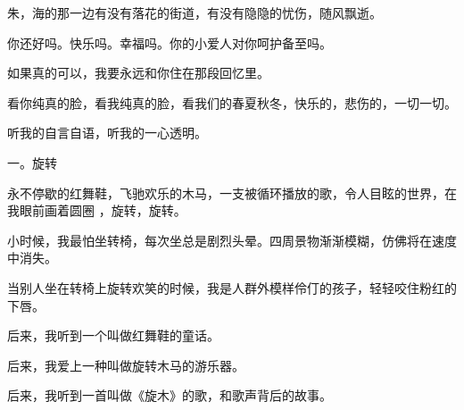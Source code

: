 \documentclass[12pt,a4paper]{article}
\def\blankrev{\vspace{1ex}}									%
\newcommand{\subpart}[1]{
	\begingroup \par
	\vspace{1ex} \centering #1
	\par \endgroup \nopagebreak[4]
}
\begin{document}
		朱，海的那一边有没有落花的街道，有没有隐隐的忧伤，随风飘逝。

		你还好吗。快乐吗。幸福吗。你的小爱人对你呵护备至吗。

		如果真的可以，我要永远和你住在那段回忆里。

		看你纯真的脸，看我纯真的脸，看我们的春夏秋冬，快乐的，悲伤的，一切一切。

	\endwriting




		听我的自言自语，听我的一心透明。


		\subpart{一。旋转}

		永不停歇的红舞鞋，飞驰欢乐的木马，一支被循环播放的歌，令人目眩的世界，在我眼前画着圆圈
	，旋转，旋转。

		小时候，我最怕坐转椅，每次坐总是剧烈头晕。四周景物渐渐模糊，仿佛将在速度中消失。\par
		当别人坐在转椅上旋转欢笑的时候，我是人群外模样伶仃的孩子，轻轻咬住粉红的下唇。

		\blankrev
		后来，我听到一个叫做红舞鞋的童话。\par
		后来，我爱上一种叫做旋转木马的游乐器。\par
		后来，我听到一首叫做《旋木》的歌，和歌声背后的故事。
\end{document}
